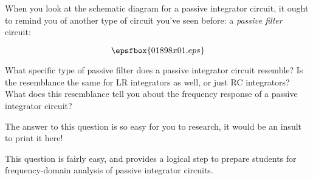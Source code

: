 

When you look at the schematic diagram for a passive integrator circuit, it ought to remind you of another type of circuit you've seen before: a {\it passive filter} circuit:

$$\epsfbox{01898x01.eps}$$

What specific type of passive filter does a passive integrator circuit resemble?  Is the resemblance the same for LR integrators as well, or just RC integrators?  What does this resemblance tell you about the frequency response of a passive integrator circuit?







The answer to this question is so easy for you to research, it would be an insult to print it here!







This question is fairly easy, and provides a logical step to prepare students for frequency-domain analysis of passive integrator circuits.




